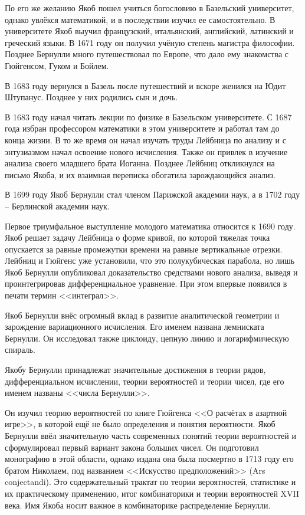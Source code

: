 \documentclass[12pt]{extarticle}
\begin{document}
По его же желанию Якоб пошел учиться богословию в Базельский университет, однако увлёкся математикой, и в последствии изучил ее самостоятельно. 
В университете Якоб выучил французский, итальянский, английский, латинский и греческий языки.
В 1671 году он получил учёную степень магистра философии.
Позднее Бернулли много путешествовал по Европе, что дало ему знакомства с Гюйгенсом, Гуком и Бойлем.

В 1683 году вернулся в Базель после путешествий и вскоре женился на Юдит Штупанус. Позднее у них родились сын и дочь.

В 1683 году начал читать лекции по физике в Базельском университете. 
С 1687 года избран профессором математики в этом университете и работал там до конца жизни.
В то же время он начал изучать труды Лейбница по анализу и с энтузиазмом начал освоение нового исчисления. 
Также он привлек в изучение анализа своего младшего брата Иоганна.
Позднее Лейбниц откликнулся на письмо Якоба, и их взаимная переписка обогатила зарождающийся анализ.

В 1699 году Якоб Бернулли стал членом Парижской академии наук, а в 1702 году -- Берлинской академии наук.

Первое триумфальное выступление молодого математика относится к 1690 году. Якоб решает задачу Лейбница о форме кривой, по которой тяжелая точка опускается за равные промежутки времени на равные вертикальные отрезки. Лейбниц и Гюйгенс уже установили, что это полукубическая парабола, но лишь Якоб Бернулли опубликовал доказательство средствами нового анализа, выведя и проинтегрировав дифференциальное уравнение. При этом впервые появился в печати термин <<интеграл>>.

Якоб Бернулли внёс огромный вклад в развитие аналитической геометрии и зарождение вариационного исчисления. Его именем названа лемниската Бернулли. Он исследовал также циклоиду, цепную линию и логарифмическую спираль.

Якобу Бернулли принадлежат значительные достижения в теории рядов, дифференциальном исчислении, теории вероятностей и теории чисел, где его именем названы <<числа Бернулли>>.

Он изучил теорию вероятностей по книге Гюйгенса <<О расчётах в азартной игре>>, в которой ещё не было определения и понятия вероятности. 
Якоб Бернулли ввёл значительную часть современных понятий теории вероятностей и сформулировал первый вариант закона больших чисел. 
Он подготовил монографию в этой области, однако издана она была посмертно в 1713 году его братом Николаем, под названием <<Искусство предположений>> (Ars conjectandi). 
Это содержательный трактат по теории вероятностей, статистике и их практическому применению, итог комбинаторики и теории вероятностей XVII века.
Имя Якоба носит важное в комбинаторике распределение Бернулли.
\end{document}
